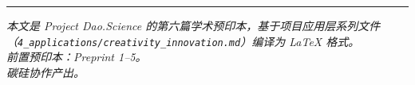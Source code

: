 \documentclass[UTF8,12pt,a4paper]{ctexart}
\begin{document}
\vspace{1cm}
\noindent\rule{\textwidth}{0.4pt}
\begin{center}
\textit{本文是 Project Dao.Science 的第六篇学术预印本，基于项目应用层系列文件\\（\texttt{4\_applications/creativity\_innovation.md}）编译为 LaTeX 格式。}\\
\textit{前置预印本：Preprint 1--5。}\\
\textit{碳硅协作产出。}
\end{center}
\end{document}
